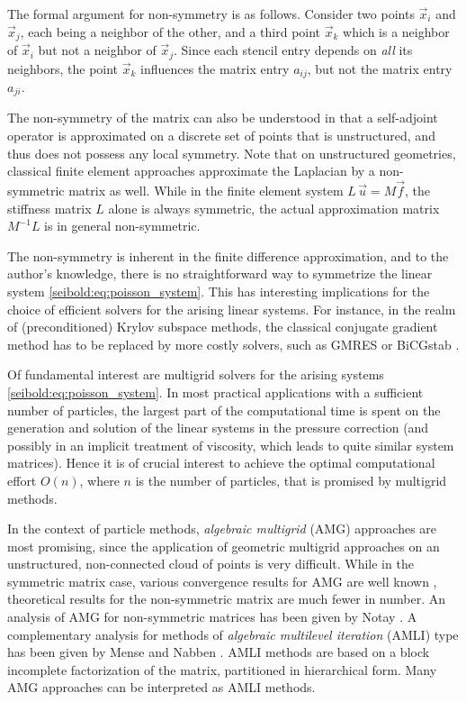 \documentclass[reqno]{amsart}
\theoremstyle{plain}
\theoremstyle{definition}
\theoremstyle{remark}
\begin{document}
The formal argument for non-symmetry is as follows.
Consider two points $\vec{x}_i$ and $\vec{x}_j$, each being a neighbor of the other,
and a third point $\vec{x}_k$ which is a neighbor of $\vec{x}_i$ but not a neighbor of
$\vec{x}_j$. Since each stencil entry depends on \emph{all} its neighbors, the point
$\vec{x}_k$ influences the matrix entry $a_{ij}$, but not the matrix entry $a_{ji}$.

The non-symmetry of the matrix can also be understood in that a self-adjoint operator
is approximated on a discrete set of points that is unstructured, and thus does not
possess any local symmetry. Note that on unstructured geometries, classical finite
element approaches \cite{StrangFix1973} approximate the Laplacian by a non-symmetric
matrix as well. While in the finite element system $L\,\vec{u} = M\vec{f}$,
the stiffness matrix $L$ alone is always symmetric, the actual approximation matrix
$M^{-1}L$ is in general non-symmetric.

The non-symmetry is inherent in the finite difference approximation, and to the
author's knowledge, there is no straightforward way to symmetrize the linear system
\eqref{seibold:eq:poisson_system}. This has interesting implications for the choice
of efficient solvers for the arising linear systems. For instance, in the realm of
(preconditioned) Krylov subspace methods, the classical conjugate gradient method
has to be replaced by more costly solvers, such as GMRES \cite{SaadSchultz1986}
or BiCGstab \cite{VanDerVorst1992}.

Of fundamental interest are multigrid solvers for the arising
systems \eqref{seibold:eq:poisson_system}. In most practical applications with a
sufficient number of particles, the largest part of the computational time is spent
on the generation and solution of the linear systems in the pressure correction
(and possibly in an implicit treatment of viscosity, which leads to quite similar
system matrices). Hence it is of crucial interest to achieve the optimal
computational effort $O(n)$, where $n$ is the number of particles, that is promised
by multigrid methods.

In the context of particle methods, \emph{algebraic multigrid} (AMG) approaches are most
promising, since the application of geometric multigrid approaches on an unstructured,
non-connected cloud of points is very difficult. While in the symmetric matrix case,
various convergence results for AMG are well
known \cite{Brandt1986,Stueben2001,TrottenbergOosterleeSchuller2001},
theoretical results for the non-symmetric matrix are much fewer in number.
An analysis of AMG for non-symmetric matrices has been given by
Notay \cite{Notay2000,Notay2009}.
A complementary analysis for methods of \emph{algebraic multilevel iteration} (AMLI)
type \cite{AxelssonVassilevski1989,AxelssonVassilevski1990}
has been given by Mense and Nabben \cite{MenseNabben2008_1,MenseNabben2008_2}.
AMLI methods are based on a block incomplete factorization of the matrix, partitioned
in hierarchical form. Many AMG approaches can be interpreted as AMLI methods.
\end{document}
